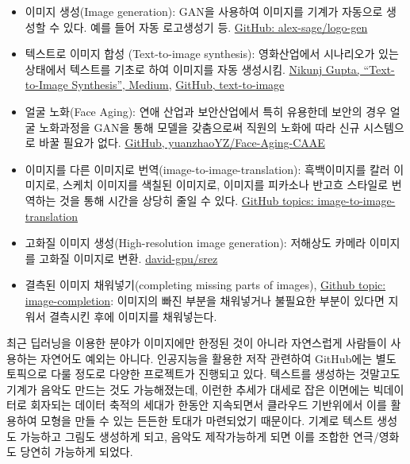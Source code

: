 \documentclass[smallextended]{svjour3}       %
\providecommand{\tightlist}{%
  \setlength{\itemsep}{0pt}\setlength{\parskip}{0pt}}
\begin{document}
\begin{itemize}
\tightlist
\item
  이미지 생성(Image generation): GAN을 사용하여 이미지를 기계가 자동으로
  생성할 수 있다. 예를 들어 자동 로고생성기 등.
  \href{https://github.com/alex-sage/logo-gen}{GitHub:
  alex-sage/logo-gen}
\item
  텍스트로 이미지 합성 (Text-to-image synthesis): 영화산업에서
  시나리오가 있는 상태에서 텍스트를 기초로 하여 이미지를 자동 생성시킴.
  \href{https://medium.com/datadriveninvestor/text-to-image-synthesis-6e5de1bf86ec}{Nikunj
  Gupta, ``Text-to-Image Synthesis'', Medium},
  \href{https://github.com/crisbodnar/text-to-image}{GitHub,
  text-to-image}
\item
  얼굴 노화(Face Aging): 연애 산업과 보안산업에서 특히 유용한데 보안의
  경우 얼굴 노화과정을 GAN을 통해 모델을 갖춤으로써 직원의 노화에 따라
  신규 시스템으로 바꿀 필요가 없다.
  \href{https://github.com/yuanzhaoYZ/Face-Aging-CAAE}{GitHub,
  yuanzhaoYZ/Face-Aging-CAAE}
\item
  이미지를 다른 이미지로 번역(image-to-image-translation): 흑백이미지를
  칼러 이미지로, 스케치 이미지를 색칠된 이미지로, 이미지를 피카소나
  반고흐 스타일로 번역하는 것을 통해 시간을 상당히 줄일 수 있다.
  \href{https://github.com/topics/image-to-image-translation}{GitHub
  topics: image-to-image-translation}
\item
  고화질 이미지 생성(High-resolution image generation): 저해상도 카메라
  이미지를 고화질 이미지로 변환.
  \href{https://github.com/david-gpu/srez}{david-gpu/srez}
\item
  결측된 이미지 채워넣기(completing missing parts of images),
  \href{https://github.com/topics/image-completion}{Github topic:
  image-completion}: 이미지의 빠진 부분을 채워넣거나 불필요한 부분이
  있다면 지워서 결측시킨 후에 이미지를 채워넣는다.
\end{itemize}

최근 딥러닝을 이용한 분야가 이미지에만 한정된 것이 아니라 자연스럽게
사람들이 사용하는 자연어도 예외는 아니다. 인공지능을 활용한 저작
관련하여 GitHub에는 별도 토픽으로 다룰 정도로 다양한 프로젝트가 진행되고
있다. 텍스트를 생성하는 것말고도 기계가 음악도 만드는 것도 가능해졌는데,
이런한 추세가 대세로 잡은 이면에는 빅데이터로 회자되는 데이터 축적의
세대가 한동안 지속되면서 클라우드 기반위에서 이를 활용하여 모형을 만들
수 있는 든든한 토대가 마련되었기 때문이다. 기계로 텍스트 생성도 가능하고
그림도 생성하게 되고, 음악도 제작가능하게 되면 이를 조합한 연극/영화도
당연히 가능하게 되었다.
\end{document}
